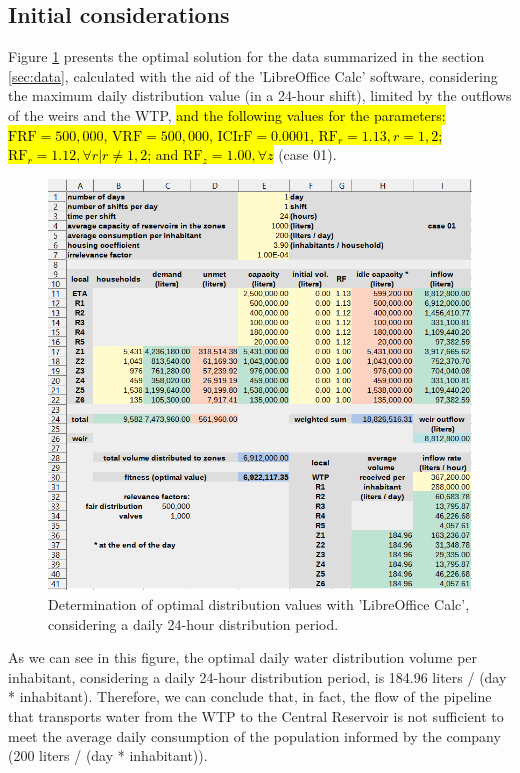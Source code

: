 \documentclass{singlecol}
\theoremstyle{TH}{
\newtheorem{lemma}{Lemma}
\newtheorem{theorem}[lemma]{Theorem}
\newtheorem{corrolary}[lemma]{Corrolary}
\newtheorem{conjecture}[lemma]{Conjecture}
\newtheorem{proposition}[lemma]{Proposition}
\newtheorem{claim}[lemma]{Claim}
\newtheorem{stheorem}[lemma]{Wrong Theorem}
\newtheorem{algorithm}{Algorithm}
}
\theoremstyle{THrm}{
\newtheorem{definition}{Definition}[section]
\newtheorem{question}{Question}[section]
\newtheorem{remark}{Remark}
\newtheorem{scheme}{Scheme}
}
\theoremstyle{THhit}{
\newtheorem{case}{Case}[section]
}
\begin{document}
\subsection{Initial considerations}
\label{sec:initialConsiderations}

Figure \ref{fig:evalOptimalValues} presents the optimal solution for the data summarized in the section \ref{sec:data}, calculated with the aid of the 'LibreOffice Calc' software, considering the maximum daily distribution value (in a 24-hour shift), limited by the outflows of the weirs and the WTP,  \hl{and the following values for the parameters: $\mathrm{FRF}= 500,000$, $\mathrm{VRF}= 500,000$,  $\mathrm{ICIrF} = 0.0001$,  $\mathrm{RF}_r = 1.13, r=1,2$;  $\mathrm{RF}_r = 1.12,  \forall r | r \neq 1,2$; and $\mathrm{RF}_z =1.00, \forall z$} (case 01). 

\begin{figure}[h]
	\begin{center}
	    \caption{Determination of optimal distribution values with 'LibreOffice Calc', considering a daily 24-hour distribution period.}
		\label{fig:evalOptimalValues}
		\centering
		\includegraphics[width=\textwidth]{figures/evalCase01.png}
	\end{center}
\end{figure}

As we can see in this figure, the optimal daily water distribution volume per inhabitant, considering a daily 24-hour distribution period, is 184.96 liters / (day * inhabitant). Therefore, we can conclude that, in fact, the flow of the pipeline that transports water from the WTP to the Central Reservoir is not sufficient to meet the average daily consumption of the population informed by the company (200 liters / (day * inhabitant)).
\end{document}

